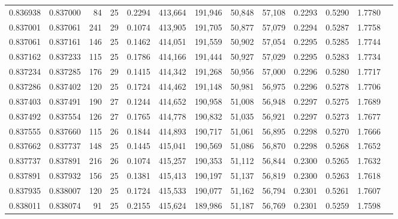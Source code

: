 \begin{tabular}{rrrrrrrrrrrrr}
0.836938 & 0.837000 &    84 &  25 &                                     0.2294 & 413,664 & 191,946 &  50,848 &  57,108 & 0.2293 & 0.5290 & 1.7780 \\
0.837001 & 0.837061 &   241 &  29 &                                     0.1074 & 413,905 & 191,705 &  50,877 &  57,079 & 0.2294 & 0.5287 & 1.7758 \\
0.837061 & 0.837161 &   146 &  25 &                                     0.1462 & 414,051 & 191,559 &  50,902 &  57,054 & 0.2295 & 0.5285 & 1.7744 \\
0.837162 & 0.837233 &   115 &  25 &                                     0.1786 & 414,166 & 191,444 &  50,927 &  57,029 & 0.2295 & 0.5283 & 1.7734 \\
0.837234 & 0.837285 &   176 &  29 &                                     0.1415 & 414,342 & 191,268 &  50,956 &  57,000 & 0.2296 & 0.5280 & 1.7717 \\
0.837286 & 0.837402 &   120 &  25 &                                     0.1724 & 414,462 & 191,148 &  50,981 &  56,975 & 0.2296 & 0.5278 & 1.7706 \\
0.837403 & 0.837491 &   190 &  27 &                                     0.1244 & 414,652 & 190,958 &  51,008 &  56,948 & 0.2297 & 0.5275 & 1.7689 \\
0.837492 & 0.837554 &   126 &  27 &                                     0.1765 & 414,778 & 190,832 &  51,035 &  56,921 & 0.2297 & 0.5273 & 1.7677 \\
0.837555 & 0.837660 &   115 &  26 &                                     0.1844 & 414,893 & 190,717 &  51,061 &  56,895 & 0.2298 & 0.5270 & 1.7666 \\
0.837662 & 0.837737 &   148 &  25 &                                     0.1445 & 415,041 & 190,569 &  51,086 &  56,870 & 0.2298 & 0.5268 & 1.7652 \\
0.837737 & 0.837891 &   216 &  26 &                                     0.1074 & 415,257 & 190,353 &  51,112 &  56,844 & 0.2300 & 0.5265 & 1.7632 \\
0.837891 & 0.837932 &   156 &  25 &                                     0.1381 & 415,413 & 190,197 &  51,137 &  56,819 & 0.2300 & 0.5263 & 1.7618 \\
0.837935 & 0.838007 &   120 &  25 &                                     0.1724 & 415,533 & 190,077 &  51,162 &  56,794 & 0.2301 & 0.5261 & 1.7607 \\
0.838011 & 0.838074 &    91 &  25 &                                     0.2155 & 415,624 & 189,986 &  51,187 &  56,769 & 0.2301 & 0.5259 & 1.7598 \\

\end{tabular}
